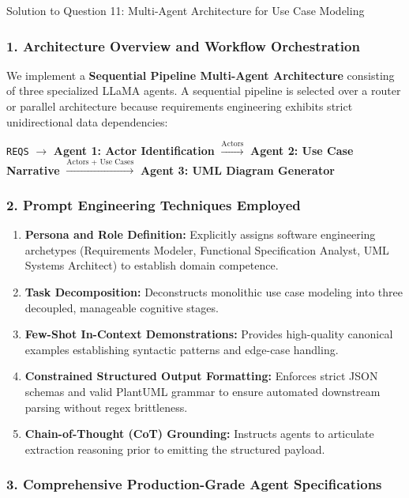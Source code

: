 \documentclass[11pt,a4paper]{article}
\begin{document}
\vspace{10pt}

\begin{solutionbox}{Solution to Question 11: Multi-Agent Architecture for Use Case Modeling}
\subsubsection*{1. Architecture Overview and Workflow Orchestration}
We implement a \textbf{Sequential Pipeline Multi-Agent Architecture} consisting of three specialized LLaMA agents. A sequential pipeline is selected over a router or parallel architecture because requirements engineering exhibits strict unidirectional data dependencies:
\begin{center}
\texttt{REQS} $\xrightarrow{\quad}$ \textbf{Agent 1: Actor Identification} $\xrightarrow{\text{Actors}}$ \textbf{Agent 2: Use Case Narrative} $\xrightarrow{\text{Actors + Use Cases}}$ \textbf{Agent 3: UML Diagram Generator}
\end{center}

\subsubsection*{2. Prompt Engineering Techniques Employed}
\begin{enumerate}[label=\textbf{\arabic*.}]
    \item \textbf{Persona and Role Definition:} Explicitly assigns software engineering archetypes (Requirements Modeler, Functional Specification Analyst, UML Systems Architect) to establish domain competence.
    \item \textbf{Task Decomposition:} Deconstructs monolithic use case modeling into three decoupled, manageable cognitive stages.
    \item \textbf{Few-Shot In-Context Demonstrations:} Provides high-quality canonical examples establishing syntactic patterns and edge-case handling.
    \item \textbf{Constrained Structured Output Formatting:} Enforces strict JSON schemas and valid PlantUML grammar to ensure automated downstream parsing without regex brittleness.
    \item \textbf{Chain-of-Thought (CoT) Grounding:} Instructs agents to articulate extraction reasoning prior to emitting the structured payload.
\end{enumerate}

\subsubsection*{3. Comprehensive Production-Grade Agent Specifications}


\end{solutionbox}
\end{document}
